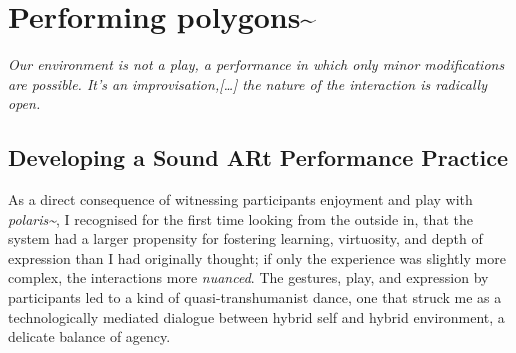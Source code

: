 \chapter{Performing polygons\textasciitilde{}}
\label{sec: polygons}
\epigraph{\emph{Our environment is not a play, a performance in which only minor modifications are possible. It's an improvisation,[…] the nature of the interaction is radically open.}}{\citep{vermeulen2015}}
\section{Developing a Sound ARt Performance Practice} \label{sec: polygons-developing}
As a direct consequence of witnessing participants enjoyment and play with \textit{polaris\textasciitilde{}}, I recognised for the first time looking from the outside in, that the system had a larger propensity for fostering learning, virtuosity, and depth of expression than I had originally thought; if only the experience was slightly more complex, the interactions more \textit{nuanced}. The gestures, play, and expression by participants led to a kind of quasi-transhumanist dance, one that struck me as a technologically mediated dialogue between hybrid self and hybrid environment, a delicate balance of agency.

